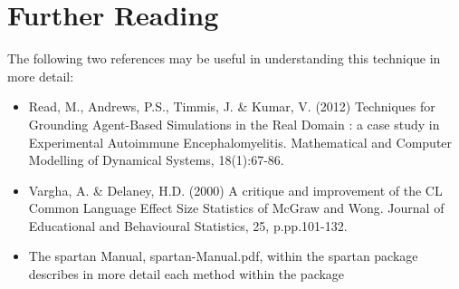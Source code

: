 \documentclass[a4paper,11pt]{article}
\begin{document}
\section{Further Reading}
\noindent
The following two references may be useful in understanding this technique in more detail:
\begin{itemize}
\item Read, M., Andrews, P.S., Timmis, J. \& Kumar, V. (2012) Techniques for Grounding Agent-Based Simulations in the Real Domain : a case study in Experimental Autoimmune Encephalomyelitis. Mathematical and Computer Modelling of Dynamical Systems, 18(1):67-86.
\item Vargha, A. \& Delaney, H.D. (2000) A critique and improvement of the CL Common Language Effect Size Statistics of McGraw and Wong. Journal of Educational and Behavioural Statistics, 25, p.pp.101-132.
\item The spartan Manual, spartan-Manual.pdf, within the spartan package describes in more detail each method within the package
\end{itemize}
\end{document}
